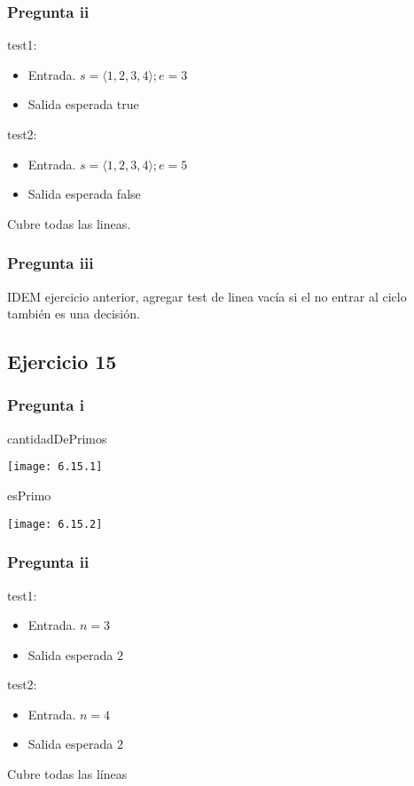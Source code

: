 \subsubsection{Pregunta ii}
test1:
\begin{itemize}
    \item Entrada. $ s = \langle 1,2,3,4 \rangle; e = 3 $
    \item Salida esperada true
\end{itemize}

test2:
\begin{itemize}
    \item Entrada. $ s = \langle 1,2,3,4 \rangle; e = 5 $
    \item Salida esperada false
\end{itemize}
Cubre todas las lineas.

\subsubsection{Pregunta iii}
IDEM ejercicio anterior, agregar test de linea vacía si el no entrar al ciclo también es una decisión.

\subsection{Ejercicio 15}
\subsubsection{Pregunta i}
cantidadDePrimos

\texttt{[image: 6.15.1]}

esPrimo

\texttt{[image: 6.15.2]}

\subsubsection{Pregunta ii}
test1:
\begin{itemize}
    \item Entrada. $ n = 3 $
    \item Salida esperada $ 2 $
\end{itemize}

test2:
\begin{itemize}
    \item Entrada. $ n = 4 $
    \item Salida esperada $ 2 $
\end{itemize}
Cubre todas las líneas


